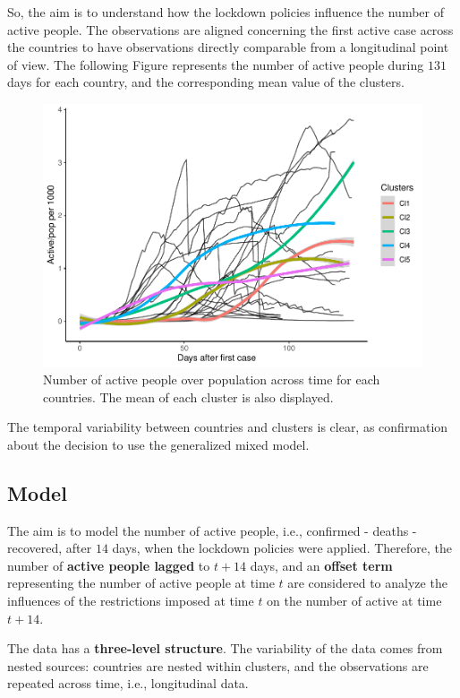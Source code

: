 \documentclass[
  6pt,
]{article}
\begin{document}
So, the aim is to understand how the lockdown policies influence the
number of active people. The observations are aligned concerning the
first active case across the countries to have observations directly
comparable from a longitudinal point of view. The following Figure
represents the number of active people during \(131\) days for each
country, and the corresponding mean value of the clusters.

\begin{figure}
\centering
\includegraphics[width=.7\textwidth]{Report_SC_Group3_files/figure-latex/unnamed-chunk-14-1.pdf}
\caption{\label{fig:figsA1} Number of active people over population
across time for each countries. The mean of each cluster is also
displayed.}
\end{figure}

The temporal variability between countries and clusters is clear, as
confirmation about the decision to use the generalized mixed model.

\hypertarget{model}{%
\subsection{Model}\label{model}}

The aim is to model the number of active people, i.e., confirmed -
deaths - recovered, after \(14\) days, when the lockdown policies were
applied. Therefore, the number of \textbf{active people lagged} to
\(t+14\) days, and an \textbf{offset term} representing the number of
active people at time \(t\) are considered to analyze the influences of
the restrictions imposed at time \(t\) on the number of active at time
\(t+14\).

The data has a \textbf{three-level structure}. The variability of the
data comes from nested sources: countries are nested within clusters,
and the observations are repeated across time, i.e., longitudinal data.
\end{document}
